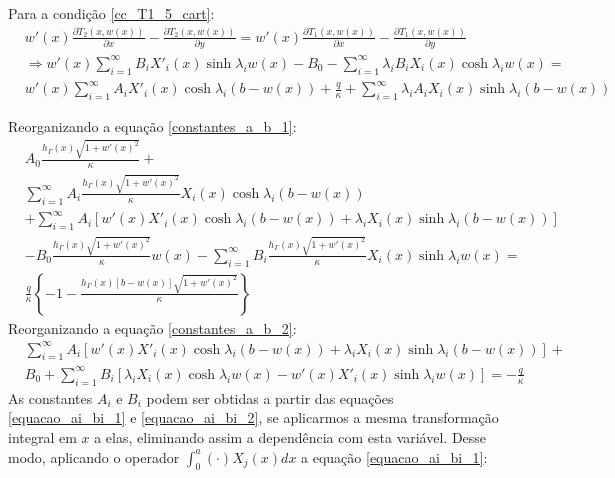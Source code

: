 Para a condição \eqref{cc_T1_5_cart}:
\begin{align}
	& w'(x)\frac{\partial T_2(x, w(x))}{\partial x} - \frac{\partial T_2(x, w(x))}{\partial y} = 
	w'(x)\frac{\partial T_1(x, w(x))}{\partial x} - \frac{\partial T_1(x, w(x))}{\partial y} \nonumber \\
	& \Rightarrow w'(x)\sum_{i=1}^\infty B_i X'_i(x)\sinh\lambda_i w(x)
	- B_0 - \sum_{i=1}^\infty \lambda_i B_i X_i(x)\cosh\lambda_i w(x) = \nonumber \\
	& w'(x)\sum_{i=1}^\infty A_i X'_i(x) \cosh\lambda_i (b - w(x))
		+ \frac{q}{\kappa} + \sum_{i=1}^\infty \lambda_i A_i X_i(x) \sinh\lambda_i (b - w(x)) \label{constantes_a_b_2}
\end{align}

Reorganizando a equação \eqref{constantes_a_b_1}:
\begin{align}	
	& A_0 \frac{h_\Gamma(x)\sqrt{1 + w'(x)^2}}{\kappa} + \nonumber \\
	& \sum_{i=1}^\infty A_i \frac{h_\Gamma(x)\sqrt{1 + w'(x)^2}}{\kappa} X_i(x) \cosh\lambda_i (b - w(x))  \nonumber \\
	& + \sum_{i=1}^\infty A_i [w'(x)X'_i(x) \cosh\lambda_i (b - w(x)) + \lambda_i X_i(x) \sinh\lambda_i (b - w(x))] \nonumber \\		
		&
		- B_0 \frac{h_\Gamma(x)\sqrt{1 + w'(x)^2}}{\kappa} w(x) - \sum_{i=1}^\infty B_i \frac{h_\Gamma(x)\sqrt{1 + w'(x)^2}}{\kappa} X_i(x)\sinh\lambda_i w(x) = \nonumber \\
		& \frac{q}{\kappa}\left\lbrace -1 - \frac{h_\Gamma(x)[b - w(x)]\sqrt{1 + w'(x)^2}}{\kappa}\right\rbrace \label{equacao_ai_bi_1}
\end{align}
Reorganizando a equação \eqref{constantes_a_b_2}:
\begin{align}
	&
	\sum_{i=1}^\infty A_i [w'(x) X'_i(x) \cosh\lambda_i (b - w(x))
		+ \lambda_i X_i(x) \sinh\lambda_i (b - w(x))] + \nonumber \\
	&
	B_0 + \sum_{i=1}^\infty B_i [\lambda_i X_i(x)\cosh\lambda_i w(x)
	-
	w'(x) X'_i(x)\sinh\lambda_i w(x)] = -\frac{q}{\kappa} \label{equacao_ai_bi_2}
\end{align}
As constantes $A_i$ e $B_i$ podem ser obtidas a partir das equações \eqref{equacao_ai_bi_1} e \eqref{equacao_ai_bi_2},
se aplicarmos a mesma transformação integral em $x$ a elas, eliminando assim a dependência com esta variável.
Desse modo, aplicando o operador $\displaystyle\int_0^a\left(\cdot\right)X_j(x)dx$ a equação \eqref{equacao_ai_bi_1}:
